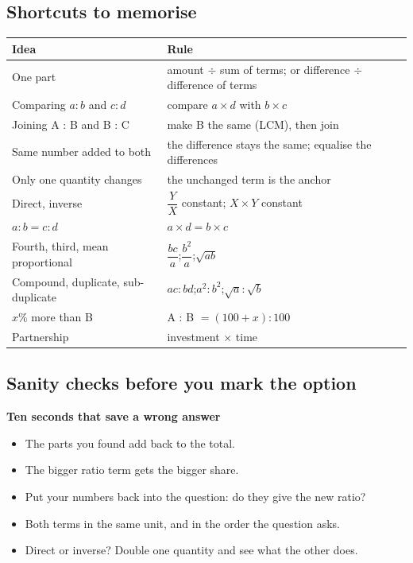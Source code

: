 \documentclass[11pt,a4paper]{article}
\let\oldsubsection\subsection
\renewcommand{\subsection}{\needspace{9\baselineskip}\oldsubsection}
\newcommand{\infobox}[2]{\par\medskip\noindent\begingroup\setlength{\fboxsep}{7pt}%
  \colorbox{codebg}{\parbox{\dimexpr\linewidth-14pt\relax}{\textbf{\color{ember}#1}\par\smallskip #2}}\endgroup\par\medskip}
\begin{document}
\subsection*{Shortcuts to memorise}
\begin{center}\small\renewcommand{\arraystretch}{1.9}\setlength{\tabcolsep}{8pt}
\begin{tabularx}{\linewidth}{@{}>{\raggedright\arraybackslash}X>{\raggedright\arraybackslash}X@{}}
\toprule
\textbf{\color{slate}Idea} & \textbf{\color{slate}Rule} \\ \midrule
One part & amount $\div$ sum of terms; or difference $\div$ difference of terms \\
Comparing $a : b$ and $c : d$ & compare $a \times d$ with $b \times c$ \\
Joining A : B and B : C & make B the same (LCM), then join \\
Same number added to both & the difference stays the same; equalise the differences \\
Only one quantity changes & the unchanged term is the anchor \\
Direct, inverse & $\dfrac{Y}{X}$ constant; $X \times Y$ constant \\
$a : b = c : d$ & $a \times d = b \times c$ \\
Fourth, third, mean proportional & $\dfrac{bc}{a}$;\quad $\dfrac{b^2}{a}$;\quad $\sqrt{ab}$ \\
Compound, duplicate, sub-duplicate & $ac : bd$;\quad $a^2 : b^2$;\quad $\sqrt{a} : \sqrt{b}$ \\
$x\%$ more than B & A : B $= (100+x) : 100$ \\
Partnership & investment $\times$ time \\
\bottomrule
\end{tabularx}\end{center}

\subsection*{Sanity checks before you mark the option}
\infobox{Ten seconds that save a wrong answer}{
\begin{itemize}
\item The parts you found add back to the total.
\item The bigger ratio term gets the bigger share.
\item Put your numbers back into the question: do they give the new ratio?
\item Both terms in the same unit, and in the order the question asks.
\item Direct or inverse? Double one quantity and see what the other does.
\end{itemize}}
\end{document}
